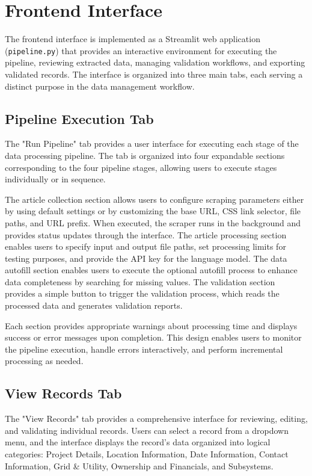 \documentclass[11pt]{article}
\begin{document}
\section{Frontend Interface}
\label{sec:frontend}

The frontend interface is implemented as a Streamlit web application (\texttt{pipeline.py}) that provides an interactive environment for executing the pipeline, reviewing extracted data, managing validation workflows, and exporting validated records. The interface is organized into three main tabs, each serving a distinct purpose in the data management workflow.

\subsection{Pipeline Execution Tab}

The "Run Pipeline" tab provides a user interface for executing each stage of the data processing pipeline. The tab is organized into four expandable sections corresponding to the four pipeline stages, allowing users to execute stages individually or in sequence.

The article collection section allows users to configure scraping parameters either by using default settings or by customizing the base URL, CSS link selector, file paths, and URL prefix. When executed, the scraper runs in the background and provides status updates through the interface. The article processing section enables users to specify input and output file paths, set processing limits for testing purposes, and provide the API key for the language model. The data autofill section enables users to execute the optional autofill process to enhance data completeness by searching for missing values. The validation section provides a simple button to trigger the validation process, which reads the processed data and generates validation reports.

Each section provides appropriate warnings about processing time and displays success or error messages upon completion. This design enables users to monitor the pipeline execution, handle errors interactively, and perform incremental processing as needed.

\subsection{View Records Tab}

The "View Records" tab provides a comprehensive interface for reviewing, editing, and validating individual records. Users can select a record from a dropdown menu, and the interface displays the record's data organized into logical categories: Project Details, Location Information, Date Information, Contact Information, Grid \& Utility, Ownership and Financials, and Subsystems.
\end{document}

